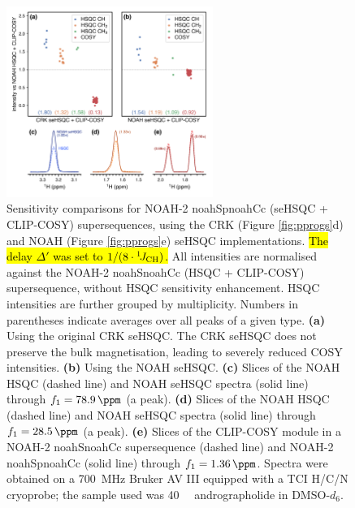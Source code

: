 \documentclass[11pt]{article}
\newcommand*{\noahtwo}[2]{\csname noah#1\endcsname\csname noah#2\endcsname}
\newcommand*{\onejch}{{}^{1}\!J_{\ce{CH}}}
\newcommand*{\figref}[1]{Figure \ref{fig:#1}}
\newcommand*{\andro}{Spectra were obtained on a \SI{700}{\MHz} Bruker AV III equipped with a TCI H/C/N cryoprobe; the sample used was \SI{40}{\milli\molar} andrographolide in DMSO-$d_6$.}
\begin{document}
\begin{figure}
    \centering
    \includegraphics[width=0.6\textwidth]{spor_spv2_comp.png}
    \caption{
        Sensitivity comparisons for NOAH-2 \noahtwo{Sp}{Cc} (seHSQC + CLIP-COSY) supersequences, using the CRK (\figref{pprogs}d) and NOAH (\figref{pprogs}e) seHSQC implementations.
        \hl{The delay $\Delta'$ was set to $1/(8\cdot\onejch)$.}
        All intensities are normalised against the NOAH-2 \noahtwo{S}{Cc} (HSQC + CLIP-COSY) supersequence, without HSQC sensitivity enhancement.
        HSQC intensities are further grouped by multiplicity.
        Numbers in parentheses indicate averages over all peaks of a given type.
        \textbf{(a)} Using the original CRK seHSQC.
        The CRK seHSQC does not preserve the bulk magnetisation, leading to severely reduced COSY intensities.
        \textbf{(b)} Using the NOAH seHSQC.
        \textbf{(c)} Slices of the NOAH HSQC (dashed line) and NOAH seHSQC spectra (solid line) through $f_1 = \SI{78.9}{\ppm}$ (a  peak).
        \textbf{(d)} Slices of the NOAH HSQC (dashed line) and NOAH seHSQC spectra (solid line) through $f_1 = \SI{28.5}{\ppm}$ (a  peak).
        \textbf{(e)} Slices of the CLIP-COSY module in a NOAH-2 \noahtwo{S}{Cc} supersequence (dashed line) and NOAH-2 \noahtwo{Sp}{Cc} (solid line) through $f_1 = \SI{1.36}{\ppm}$.
        \andro{}
    }
    \label{fig:spor_spv2}
\end{figure}
\end{document}

